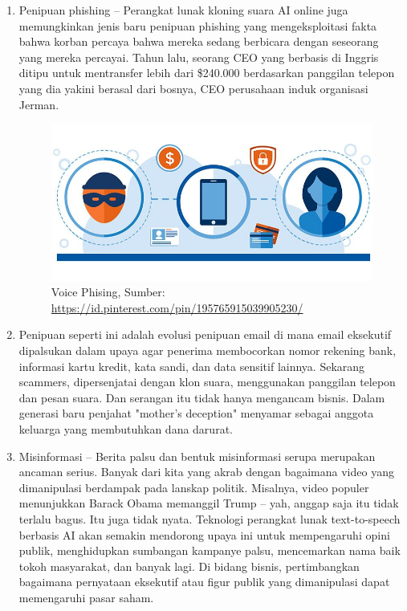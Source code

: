 \begin{enumerate}
\item Penipuan phishing – Perangkat lunak kloning suara AI online juga memungkinkan jenis baru penipuan phishing yang mengeksploitasi fakta bahwa korban percaya bahwa mereka sedang berbicara dengan seseorang yang mereka percayai. Tahun lalu, seorang CEO yang berbasis di Inggris ditipu untuk mentransfer lebih dari \$240.000 berdasarkan panggilan telepon yang dia yakini berasal dari bosnya, CEO perusahaan induk organisasi Jerman.
\begin{figure}[H]
        \centerline{\includegraphics[scale=.4]{figures/voice-phising}}
        \caption{Voice Phising, Sumber: \url{https://id.pinterest.com/pin/195765915039905230/}}
		\label{phising}
\end{figure}

\item Penipuan seperti ini adalah evolusi penipuan email di mana email eksekutif dipalsukan dalam upaya agar penerima membocorkan nomor rekening bank, informasi kartu kredit, kata sandi, dan data sensitif lainnya. Sekarang scammers, dipersenjatai dengan klon suara, menggunakan panggilan telepon dan pesan suara. Dan serangan itu tidak hanya mengancam bisnis. Dalam generasi baru penjahat "mother's deception" menyamar sebagai anggota keluarga yang membutuhkan dana darurat.

\item Misinformasi – Berita palsu dan bentuk misinformasi serupa merupakan ancaman serius. Banyak dari kita yang akrab dengan bagaimana video yang dimanipulasi berdampak pada lanskap politik. Misalnya, video populer menunjukkan Barack Obama memanggil Trump – yah, anggap saja itu tidak terlalu bagus. Itu juga tidak nyata. Teknologi perangkat lunak text-to-speech berbasis AI akan semakin mendorong upaya ini untuk mempengaruhi opini publik, menghidupkan sumbangan kampanye palsu, mencemarkan nama baik tokoh masyarakat, dan banyak lagi. Di bidang bisnis, pertimbangkan bagaimana pernyataan eksekutif atau figur publik yang dimanipulasi dapat memengaruhi pasar saham.


\end{enumerate}
